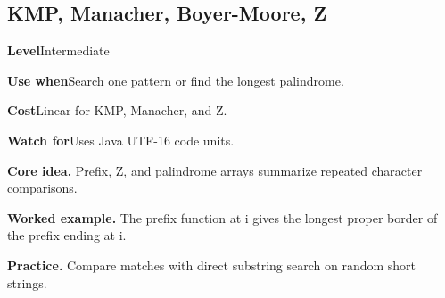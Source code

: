 \documentclass[10pt,letterpaper]{article}
\newcommand{\entrylabel}[1]{\textcolor{accent}{\bfseries #1}}
\begin{document}
\subsection{KMP, Manacher, Boyer-Moore, Z}
\begin{guidebox}\small
\entrylabel{Level}\quad Intermediate\par
\entrylabel{Use when}\quad Search one pattern or find the longest palindrome.\par
\entrylabel{Cost}\quad Linear for KMP, Manacher, and Z.\par
\entrylabel{Watch for}\quad Uses Java UTF-16 code units.\par
\end{guidebox}
\noindent\textbf{Core idea.} Prefix, Z, and palindrome arrays summarize repeated character comparisons.\par
\noindent\textbf{Worked example.} The prefix function at i gives the longest proper border of the prefix ending at i.\par
\noindent\textbf{Practice.} Compare matches with direct substring search on random short strings.\par
\end{document}
